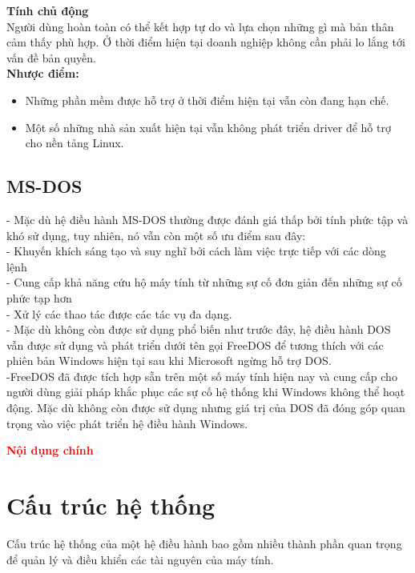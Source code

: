 \documentclass[12pt,a4paper]{article}
\begin{document}
\textbf{Tính chủ động }\\
Người dùng hoàn toàn có thể kết hợp tự do và lựa chọn những gì mà bản thân cảm thấy phù hợp. Ở thời điểm hiện tại doanh nghiệp không cần phải lo lắng tới vấn đề bản quyền.\\

\textbf{Nhược điểm: }
\begin{itemize}
	\item Những phần mềm được hỗ trợ ở thời điểm hiện tại vẫn còn đang hạn chế. 
	\item Một số những nhà sản xuất hiện tại vẫn không phát triển driver để hỗ trợ cho nền tảng Linux.
\end{itemize}
\subsection{MS-DOS}
- Mặc dù hệ điều hành MS-DOS thường được đánh giá thấp bởi tính phức tập và khó sử dụng, tuy nhiên, nó vẫn còn một số ưu điểm sau đây:\\
- Khuyến khích sáng tạo và suy nghĩ bởi cách làm việc trực tiếp với các dòng lệnh\\
- Cung cấp khả năng cứu hộ máy tính từ những sự cố đơn giản đến những sự cố phức tạp hơn\\
- Xử lý các thao tác được các tác vụ đa dạng.\\

- Mặc dù không còn được sử dụng phổ biến như trước đây, hệ điều hành DOS vẫn được sử dụng và phát triển dưới tên gọi FreeDOS để tương thích với các phiên bản Windows hiện tại sau khi Microsoft ngừng hỗ trợ DOS.\\
-FreeDOS đã được tích hợp sẵn trên một số máy tính hiện nay và cung cấp cho người dùng giải pháp khắc phục các sự cố hệ thống khi Windows không thể hoạt động. Mặc dù không còn được sử dụng nhưng giá trị của DOS đã đóng góp quan trọng vào việc phát triển hệ điều hành Windows.\\

\newpage
{}
\begin{center}
	{\fontsize{30}{14}\selectfont \textbf{\textcolor{red}{Nội dụng chính}}}
\end{center}
\setcounter{section}{0}
\section{Cấu trúc hệ thống}
Cấu trúc hệ thống của một hệ điều hành bao gồm nhiều thành phần quan trọng để quản lý và điều khiển các tài nguyên của máy tính.
\end{document}
